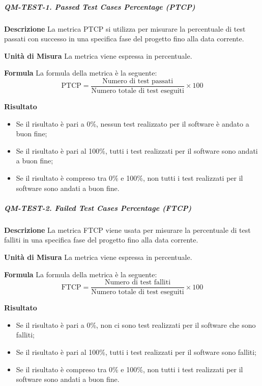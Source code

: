             \subparagraph{QM-TEST-1. Passed Test Cases Percentage (PTCP)}

                \textbf{Descrizione}
                La metrica PTCP si utilizza per misurare la percentuale di test passati con successo in una specifica fase del progetto fino alla data corrente.

                \textbf{Unità di Misura}
                La metrica viene espressa in percentuale.

                \textbf{Formula}
                La formula della metrica è la seguente:
                \[
                    \text{PTCP} = \frac{\text{Numero di test passati}}{\text{Numero totale di test eseguiti}} \times 100
                \]

                \textbf{Risultato}
                \begin{itemize}
                    \item Se il risultato è pari a 0\%, nessun test realizzato per il software è andato a buon fine;
                    \item Se il risultato è pari al 100\%, tutti i test realizzati per il software sono andati a buon fine;
                    \item Se il risultato è compreso tra 0\% e 100\%, non tutti i test realizzati per il software sono andati a buon fine.
                \end{itemize}

            \subparagraph{QM-TEST-2. Failed Test Cases Percentage (FTCP)}

                \textbf{Descrizione}
                La metrica FTCP viene usata per misurare la percentuale di test falliti in una specifica fase del progetto fino alla data corrente.

                \textbf{Unità di Misura}
                La metrica viene espressa in percentuale.

                \textbf{Formula}
                La formula della metrica è la seguente:
                \[
                    \text{FTCP} = \frac{\text{Numero di test falliti}}{\text{Numero totale di test eseguiti}} \times 100
                \]

                \textbf{Risultato}
                \begin{itemize}
                    \item Se il risultato è pari a 0\%, non ci sono test realizzati per il software che sono falliti;
                    \item Se il risultato è pari al 100\%, tutti i test realizzati per il software sono falliti;
                    \item Se il risultato è compreso tra 0\% e 100\%, non tutti i test realizzati per il software sono andati a buon fine.
                \end{itemize}

